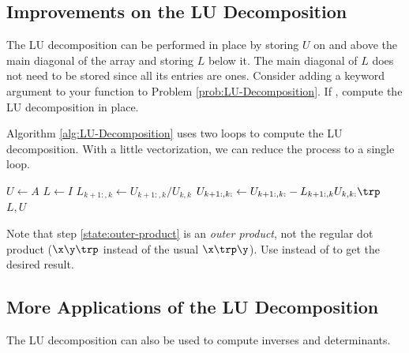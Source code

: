 \subsection*{Improvements on the LU Decomposition} %

The LU decomposition can be performed in place by storing $U$ on and above the main diagonal of the array and storing $L$ below it.
The main diagonal of $L$ does not need to be stored since all its entries are ones.
Consider adding a keyword argument  to your function to Problem \ref{prob:LU-Decomposition}.
If , compute the LU decomposition in place.

Algorithm \ref{alg:LU-Decomposition} uses two loops to compute the LU decomposition.
With a little vectorization, we can reduce the process to a single loop.

\begin{algorithm}[H]
\begin{algorithmic}[1]
\State $U \gets A$
\State $L \gets I$
    \State $L_{k+1:,k} \gets U_{k+1:,k}/U_{k,k}$
    \State $U_{k+1:,k:} \gets U_{k+1:,k:} - L_{k+1:,k}U_{k,k:}\trp$
    \label{state:outer-product}
\EndFor
\State {} $L, U$
\EndProcedure
\end{algorithmic}
\caption{}
\end{algorithm}

Note that step \ref{state:outer-product} is an \emph{outer product}, not the regular dot product ($\x\y\trp$ instead of the usual $\x\trp\y$).
Use  instead of  to get the desired result.

\newpage

\subsection*{More Applications of the LU Decomposition} %

The LU decomposition can also be used to compute inverses and determinants.

